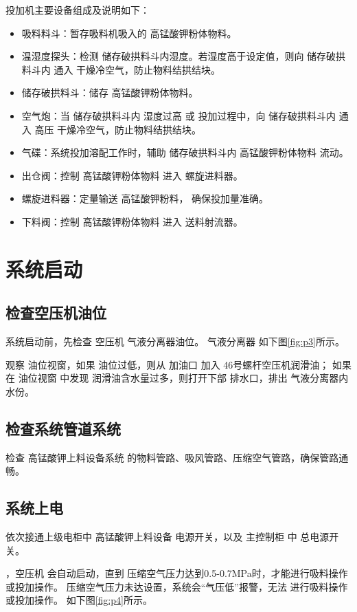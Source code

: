 \documentclass[UTF8,a4paper,12pt,titlepage]{ctexart}
\begin{document}
   
   投加机主要设备组成及说明如下：
   \begin{itemize}
       \item 吸料料斗：暂存吸料机吸入的 高锰酸钾粉体物料。
       \item 温湿度探头：检测 储存破拱料斗内湿度。若湿度高于设定值，则向 储存破拱料斗内 通入 干燥冷空气，防止物料结拱结块。
       \item 储存破拱料斗：储存 高锰酸钾粉体物料。
       \item 空气炮：当 储存破拱料斗内 湿度过高 或 投加过程中，向 储存破拱料斗内 通入 高压 干燥冷空气，防止物料结拱结块。
       \item 气碟：系统投加溶配工作时，辅助 储存破拱料斗内 高锰酸钾粉体物料 流动。
       \item 出仓阀：控制 高锰酸钾粉体物料 进入 螺旋进料器。
       \item 螺旋进料器：定量输送 高锰酸钾粉料， 确保投加量准确。
       \item 下料阀：控制 高锰酸钾粉体物料 进入 送料射流器。
   \end{itemize}

\section{系统启动}\label{sec:sg1}
   \subsection{检查空压机油位}
   系统启动前，先检查 空压机 气液分离器油位。
   气液分离器 如下图\ref{fig:p3}所示。
   
   观察 油位视窗，如果 油位过低，则从 加油口 加入 46号螺杆空压机润滑油；
   如果 在 油位视窗 中发现 润滑油含水量过多，则打开下部 排水口，排出 气液分离器内水份。

   \subsection{检查系统管道系统}
   检查 高锰酸钾上料设备系统 的物料管路、吸风管路、压缩空气管路，确保管路通畅。

   \subsection{系统上电}\label{sec:sg2}
   依次接通上级电柜中 高锰酸钾上料设备 电源开关，以及 主控制柜 中 总电源开关。
   
   ，空压机 会自动启动，直到 压缩空气压力达到0.5-0.7MPa时，才能进行吸料操作或投加操作。
   压缩空气压力未达设置，系统会“气压低”报警，无法 进行吸料操作或投加操作。
    如下图\ref{fig:p4}所示。
\end{document}
